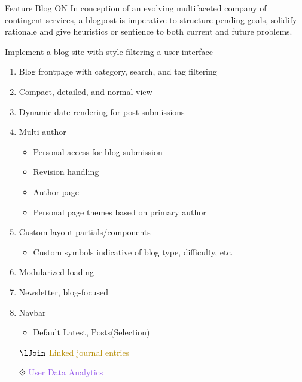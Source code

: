 \documentclass[7px]{article}
\begin{document}
\frontmatter
{Feature}
{Blog}
{ON}
{In conception of an evolving multifaceted company of contingent services, a blogpost is imperative to structure pending goals, solidify rationale and give heuristics or sentience to both current and future problems.}

\strategy
{Implement a blog site with style-filtering a user interface}
{
  \begin{enumerate}
    \item Blog frontpage with category, search, and tag filtering
    \item Compact, detailed, and normal view
    \item Dynamic date rendering for post submissions
    \item Multi-author
      \small{
        \begin{itemize}[label=$\multimapdotinv$, leftmargin=1.7mm]
          \item Personal access for blog submission
          \item Revision handling
          \item Author page
          \item Personal page themes based on primary author
        \end{itemize}
      }
      \normalsize
    \item Custom layout partials/components
      \small{
        \begin{itemize}[label=$\multimapdotinv$, leftmargin=1.7mm]
          \item Custom symbols indicative of blog type, difficulty, etc.
        \end{itemize}
      }
      \normalsize
    \item Modularized loading
    \item Newsletter, blog-focused
    \item Navbar
      \small{
        \begin{itemize}[label=$\multimapdotinv$, leftmargin=1.7mm]
          \item Default\: Latest, Posts(Selection)
        \end{itemize}
      }
      \normalsize
    \item[$\lJoin$] \textcolor[HTML]{B58B00}{Linked journal entries}
    \item[$\Diamonddot$] \textcolor[HTML]{9457EB}{User Data Analytics}
  \end{enumerate}
}
\end{document}
